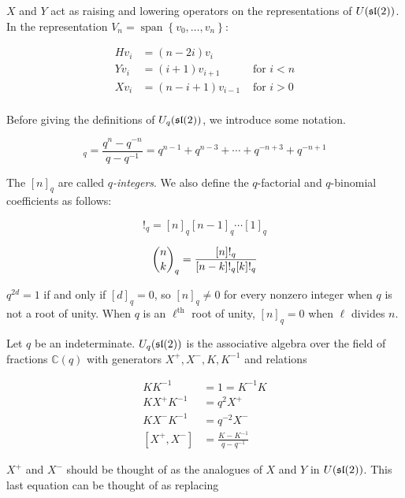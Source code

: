 $X$ and $Y$ act as raising and lowering operators on the representations of
$U(\mathfrak{sl}(2))$. In the representation $V_n = \operatorname{span}\left\{ v_0,
\ldots, v_n \right\}$:

\begin{align}
    H v_i &= (n - 2i) v_i \\
    Y v_i &= (i+1)v_{i+1}   &\text{ for $i < n$}  \\
    X v_i &= (n-i+1)v_{i-1} &\text{ for $i > 0$} \\
\end{align}

Before giving the definitions of $U_q(\mathfrak{sl}(2))$, we introduce some notation.

\begin{equation}
    [n]_q = \frac{q^n - q^{-n}}{q - q^{-1}} = q^{n-1} + q^{n-3} + \cdots + q^{-n+3} + q^{-n+1}
\end{equation}

The $[n]_q$ are called \emph{$q$-integers}. We also define the $q$-factorial
and $q$-binomial coefficients as follows:

\begin{equation}
    [n]!_q = [n]_q [n-1]_q \cdots [1]_q
\end{equation}

\begin{equation}
    \dbinom{n}{k}_q = \frac{[n]!_q}{[n-k]!_q[k]!_q}
\end{equation}

$q^{2d}=1$ if and only if $[d]_q = 0$, so $[n]_q \neq 0$ for every nonzero
integer when $q$ is not a root of unity. When $q$ is an $\ell^\text{th}$ root
of unity, $[n]_q = 0$ when $\ell$ divides $n$.

\begin{defn}
\label{Uqsl2Def}
Let $q$ be an indeterminate. $U_q(\mathfrak{sl}(2))$ is the associative algebra over the
field of fractions $\mathbb{C}(q)$ with generators $X^+,X^-,K, K^{-1}$ and
relations 

\begin{align}
    KK^{-1} &= 1 = K^{-1}K \\
    K X^+ K^{-1} &= q^2  X^+  \\
    KX^-K^{-1} &= q^{-2} X^- \\
    [ X^+ ,X^-] &= \frac{K - K^{-1}}{q - q^{-1}} \label{equation:hadamard}
\end{align}
\end{defn}

$X^+$ and $X^-$ should be thought of as the analogues of $X$ and $Y$
in $U(\mathfrak{sl}(2))$. This last equation can be thought of as replacing 

